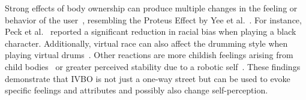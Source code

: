 Strong effects of body ownership can produce multiple changes in the feeling or behavior of the user~, resembling the Proteus Effect by Yee et al.~. For instance, Peck et al.~ reported a significant reduction in racial bias when playing a black character. Additionally, virtual race can also affect the drumming style when playing virtual drums~\cite{kilteni2013drumming}. Other reactions are more childish feelings arising from child bodies~\cite{banakou2013illusory} or greater perceived stability due to a robotic self~\cite{lugrin2016avatar}. These findings demonstrate that IVBO is not just a one-way street but can be used to evoke specific feelings and attributes and possibly also change self-perception.


